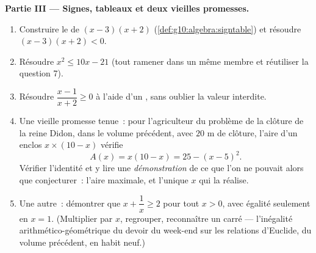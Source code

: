 \begin{problem}[{Devoir du week-end --- problèmes somme-produit,
la mise sous forme canonique telle qu'al-Khwarizmi la dessinait, et
l'équation $x^2 = x + 1$}]
\medskip
\noindent\textbf{Partie III --- Signes, tableaux et deux vieilles
promesses.}
\begin{enumerate}[resume]
  \item Construire le  de $(x - 3)(x + 2)$
        (\cref{def:g10:algebra:signtable}) et résoudre
        $(x - 3)(x + 2) < 0$.
  \item Résoudre $x^2 \leq 10x - 21$ (tout ramener dans un même
        membre et réutiliser la question 7).
  \item Résoudre $\dfrac{x - 1}{x + 2} \geq 0$ à l'aide d'un , sans oublier la valeur interdite.
  \item Une vieille promesse tenue~: pour l'agriculteur du problème de
        la clôture de la reine Didon, dans le volume précédent, avec
        $20$ m de clôture, l'aire d'un enclos $x \times (10 - x)$
        vérifie
        \[
        A(x) = x(10 - x) = 25 - (x - 5)^2 .
        \]
        Vérifier l'identité et y lire une \emph{démonstration} de ce
        que l'on ne pouvait alors que conjecturer~: l'aire maximale,
        et l'unique $x$ qui la réalise.
  \item Une autre~: démontrer que $x + \dfrac1x \geq 2$ pour tout
        $x > 0$, avec égalité seulement en $x = 1$. (Multiplier par
        $x$, regrouper, reconnaître un carré --- l'inégalité
        arithmético-géométrique du devoir du week-end sur les
        relations d'Euclide, du volume précédent, en habit neuf.)
\end{enumerate}


\end{problem}
